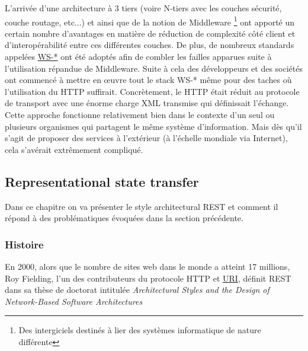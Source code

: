 L'arrivée d'une architecture à 3 tiers (voire N-tiers avec les couches sécurité, couche routage, etc...) et ainsi que de la notion de Middleware \footnote{Des intergiciels destinés à lier des systèmes informatique de nature différente }  ont apporté un certain nombre d'avantages en matière de réduction de complexité côté client et d'interopérabilité entre ces différentes couches. De plus, de nombreux standards appelées \href{https://fr.wikipedia.org/wiki/Liste_des_sp%C3%A9cifications_des_services_web_WS-*}{WS-*} 
	ont été adoptés afin de combler les failles apparues suite à l'utilisation répandue de Middleware. 
Suite à cela des développeurs et des sociétés ont commencé à mettre en œuvre tout le stack WS-* même pour des taches où l'utilisation du HTTP suffirait. Concrètement,  le HTTP était réduit au protocole de transport avec une énorme charge XML transmise qui définissait l'échange. 
\\
Cette approche fonctionne relativement bien dans le contexte d'un seul ou plusieurs organismes qui partagent le même système d'information. Mais dès qu'il s'agit de proposer des services à l'extérieur (à l'échelle mondiale via Internet), cela s'avérait extrêmement compliqué. 
\newpage





\subsection{Representational state transfer}
Dans ce chapitre on va présenter le style architectural REST et comment il répond à des problématiques évoquées dans la section précédente. 
\subsubsection{Histoire}
En 2000, alors que le nombre de sites web dans le monde a atteint 17 millions, Roy Fielding, l'un des contributeurs du protocole HTTP et \href{https://tools.ietf.org/html/rfc3986}{URI}, définit REST dans sa thèse de doctorat intitulée \emph{Architectural Styles and the Design of Network-Based Software Architectures} \cite{roythesis}






